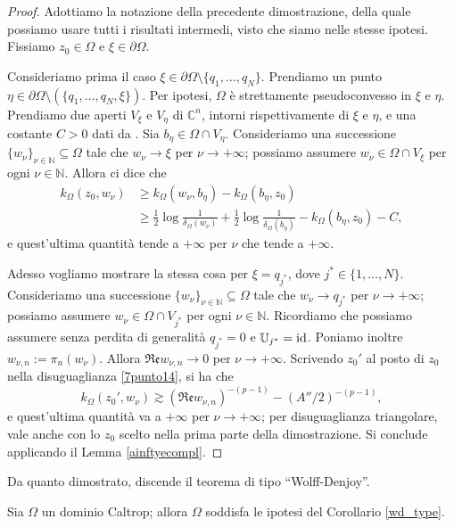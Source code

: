 \begin{proof}
    Adottiamo la notazione della precedente dimostrazione, della quale possiamo usare tutti i risultati intermedi, visto che siamo nelle stesse ipotesi. Fissiamo $z_0\in\Omega$ e $\xi\in\partial\Omega$.
    
    Consideriamo prima il caso $\xi\in\partial\Omega\setminus\{q_1,\dots,q_N\}$. Prendiamo un punto $\eta\in\partial\Omega\setminus(\{q_1,\dots,q_N,\xi\})$. Per ipotesi, $\Omega$ è strettamente pseudoconvesso in $\xi$ e $\eta$. Prendiamo due aperti $V_\xi$ e $V_\eta$ di $\mathbb{C}^n$, intorni rispettivamente di $\xi$ e $\eta$, e una costante $C>0$ dati da \cite[Corollary 2.4]{FR}. Sia $b_\eta\in\Omega\cap V_\eta$. Consideriamo una successione $\{w_\nu\}_{\nu\in\mathbb{N}}\subseteq\Omega$ tale che $w_\nu\longrightarrow\xi$ per $\nu\longrightarrow+\infty$; possiamo assumere $w_\nu\in\Omega\cap V_\xi$ per ogni $\nu\in\mathbb{N}$. Allora \cite[Corollary 2.4]{FR} ci dice che
    \begin{align*}
        k_\Omega(z_0,w_\nu)&\ge k_\Omega(w_\nu,b_\eta)-k_\Omega(b_\eta,z_0)\\
        &\ge \frac{1}{2}\log{\frac{1}{\delta_\Omega(w_\nu)}}+\frac{1}{2}\log{\frac{1}{\delta_\Omega(b_\eta)}}-k_\Omega(b_\eta,z_0)-C,
    \end{align*}
    e quest'ultima quantità tende a $+\infty$ per $\nu$ che tende a $+\infty$.

    Adesso vogliamo mostrare la stessa cosa per $\xi=q_{j^*}$, dove $j^*\in\{1,\dots,N\}$. Consideriamo una successione $\{w_\nu\}_{\nu\in\mathbb{N}}\subseteq\Omega$ tale che $w_\nu\longrightarrow q_{j^*}$ per $\nu\longrightarrow+\infty$; possiamo assumere $w_\nu\in\Omega\cap V_{j^*}$ per ogni $\nu\in\mathbb{N}$. Ricordiamo che possiamo assumere senza perdita di generalità $q_{j^*}=0$ e $\mathbb{U}_{j^*}=\operatorname{id}$. Poniamo inoltre $w_{\nu,n}:=\pi_n(w_\nu)$. Allora $\mathfrak{Re}w_{\nu,n}\longrightarrow0$ per $\nu\longrightarrow+\infty$. Scrivendo $z_0'$ al posto di $z_0$ nella disuguaglianza \eqref{7punto14}, si ha che
    $$k_\Omega(z_0',w_\nu)\gtrsim (\mathfrak{Re}w_{\nu,n})^{-(p-1)}-(A''/2)^{-(p-1)},$$
    e quest'ultima quantità va a $+\infty$ per $\nu\longrightarrow+\infty$; per disuguaglianza triangolare, vale anche con lo $z_0$ scelto nella prima parte della dimostrazione. Si conclude applicando il Lemma \ref{ainftyecompl}.
\end{proof}

Da quanto dimostrato, discende il teorema di tipo ``Wolff-Denjoy''.

\begin{cor}
    Sia $\Omega$ un dominio Caltrop; allora $\Omega$ soddisfa le ipotesi del Corollario \ref{wd_type}.
\end{cor}